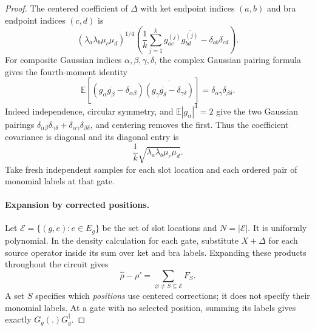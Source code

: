 \documentclass[11pt]{article}
\numberwithin{equation}{section}
\theoremstyle{definition}
\theoremstyle{remark}
\begin{document}
\begin{proof}
The centered coefficient of $\Delta$ with ket endpoint indices $(a,b)$
and bra endpoint indices $(c,d)$ is
\[
 (\lambda_a\lambda_b\mu_c\mu_d)^{1/4}
 \left(\frac1k\sum_{j=1}^k
          g_{ac}^{(j)}\overline{g_{bd}^{(j)}}
                   -\delta_{ab}\delta_{cd}\right).
\]
For composite Gaussian indices $\alpha,\beta,\gamma,\delta$, the
complex Gaussian pairing formula \cite{Isserlis1918,FassinoPistoneRogantin2019}
gives the fourth-moment identity
\begin{equation}
 \mathbb E\left[
  (g_\alpha\overline{g_\beta}-\delta_{\alpha\beta})
  \overline{(g_\gamma\overline{g_\delta}
                         -\delta_{\gamma\delta})}\right]
       =\delta_{\alpha\gamma}\delta_{\beta\delta}.
 \label{eq:compression-gaussian-covariance}
\end{equation}
Indeed independence, circular symmetry, and $\mathbb E|g_\alpha|^4=2$
give the two Gaussian pairings
$\delta_{\alpha\beta}\delta_{\gamma\delta}
 +\delta_{\alpha\gamma}\delta_{\beta\delta}$, and centering removes
the first.  Thus the coefficient covariance is diagonal and its
diagonal entry is
\begin{equation}
 \frac1k\sqrt{\lambda_a\lambda_b\mu_c\mu_d}.
 \label{eq:compression-slot-variance}
\end{equation}
Take fresh independent samples for each slot location and each ordered
pair of monomial labels at that gate.

\paragraph{Expansion by corrected positions.}
Let $\mathcal E=\{(g,e):e\in E_g\}$ be the set of slot locations and
$N=|\mathcal E|$.  It is uniformly polynomial.  In the density
calculation for each gate, substitute $X+\Delta$ for each source
operator inside its sum over ket and bra labels.  Expanding these
products throughout the circuit gives
\begin{equation}
 \widehat\rho-\rho'
       =\sum_{\varnothing\ne S\subseteq\mathcal E}F_S.
 \label{eq:compression-subset-expansion}
\end{equation}
A set $S$ specifies which \emph{positions} use centered corrections;
it does not specify their monomial labels.  At a gate with no selected
position, summing its labels gives exactly $G_g(.)G_g^\dagger$.


\end{proof}
\end{document}
